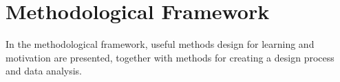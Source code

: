 \section{Methodological Framework}

  In the methodological framework, useful methods design for learning and motivation are presented, together with methods for creating a design process and data analysis.

  

  

  

  

  

  
